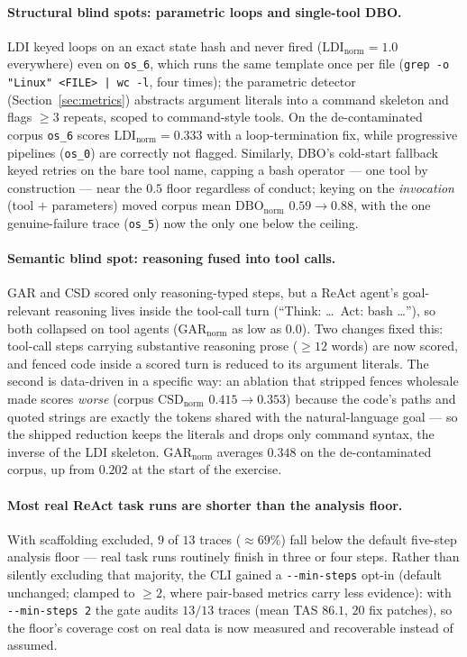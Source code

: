 \documentclass[11pt]{article}
\newcommand{\code}[1]{\texttt{#1}}
\begin{document}
\paragraph{Structural blind spots: parametric loops and single-tool DBO.} LDI
keyed loops on an exact state hash and never fired ($\mathrm{LDI_{norm}}=1.0$
everywhere) even on \code{os\_6}, which runs the same template once per file
(\code{grep -o "Linux" <FILE> | wc -l}, four times); the parametric detector
(Section~\ref{sec:metrics}) abstracts argument literals into a command skeleton
and flags $\ge 3$ repeats, scoped to command-style tools. On the
de-contaminated corpus \code{os\_6} scores $\mathrm{LDI_{norm}}=0.333$ with a
loop-termination fix, while progressive pipelines (\code{os\_0}) are correctly
not flagged. Similarly, DBO's cold-start fallback keyed retries on the bare
tool name, capping a bash operator --- one tool by construction --- near the
$0.5$ floor regardless of conduct; keying on the \emph{invocation} (tool $+$
parameters) moved corpus mean $\mathrm{DBO_{norm}}$ $0.59\to0.88$, with the one
genuine-failure trace (\code{os\_5}) now the only one below the ceiling.

\paragraph{Semantic blind spot: reasoning fused into tool calls.} GAR and CSD
scored only reasoning-typed steps, but a ReAct agent's goal-relevant reasoning
lives inside the tool-call turn (``Think: \dots\ Act: bash \dots''), so both
collapsed on tool agents ($\mathrm{GAR_{norm}}$ as low as $0.0$). Two changes
fixed this: tool-call steps carrying substantive reasoning prose ($\ge 12$
words) are now scored, and fenced code inside a scored turn is reduced to its
argument literals. The second is data-driven in a specific way: an ablation
that stripped fences wholesale made scores \emph{worse} (corpus
$\mathrm{CSD_{norm}}$ $0.415\to0.353$) because the code's paths and quoted
strings are exactly the tokens shared with the natural-language goal --- so the
shipped reduction keeps the literals and drops only command syntax, the inverse
of the LDI skeleton. $\mathrm{GAR_{norm}}$ averages $0.348$ on the
de-contaminated corpus, up from $0.202$ at the start of the exercise.

\paragraph{Most real ReAct task runs are shorter than the analysis floor.}
With scaffolding excluded, $9$ of $13$ traces ($\approx69\%$) fall below the
default five-step analysis floor --- real task runs routinely finish in three
or four steps. Rather than silently excluding that majority, the CLI gained a
\code{-{}-min-steps} opt-in (default unchanged; clamped to $\ge 2$, where
pair-based metrics carry less evidence): with \code{-{}-min-steps 2} the gate
audits $13/13$ traces (mean TAS $86.1$, $20$ fix patches), so the floor's
coverage cost on real data is now measured and recoverable instead of assumed.
\end{document}
